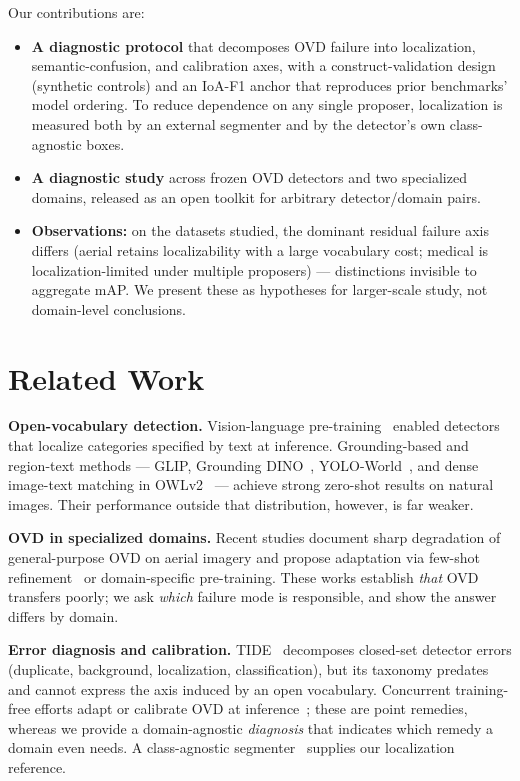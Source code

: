 \documentclass[10pt,twocolumn,letterpaper]{article}
\begin{document}
Our contributions are:
\begin{itemize}
  \item \textbf{A diagnostic protocol} that decomposes OVD failure into localization,
  semantic-confusion, and calibration axes, with a construct-validation design (synthetic
  controls) and an IoA-F1 anchor that reproduces prior benchmarks' model ordering. To reduce
  dependence on any single proposer, localization is measured both by an external
  segmenter and by the detector's own class-agnostic boxes.
  \item \textbf{A diagnostic study} across frozen OVD detectors and two specialized domains,
  released as an open toolkit for arbitrary detector/domain pairs.
  \item \textbf{Observations:} on the datasets studied, the dominant residual failure axis
  differs (aerial retains localizability with a large vocabulary cost; medical is
  localization-limited under multiple proposers) --- distinctions invisible to aggregate mAP.
  We present these as hypotheses for larger-scale study, not domain-level conclusions.
\end{itemize}

\section{Related Work}
\label{sec:related}
\textbf{Open-vocabulary detection.} Vision-language pre-training~\cite{radford2021clip}
enabled detectors that localize categories specified by text at inference. Grounding-based
and region-text methods --- GLIP, Grounding DINO~\cite{liu2023groundingdino},
YOLO-World~\cite{cheng2024yoloworld}, and dense image-text matching in
OWLv2~\cite{minderer2023scaling} --- achieve strong zero-shot results on natural images.
Their performance outside that distribution, however, is far weaker.

\textbf{OVD in specialized domains.} Recent studies document sharp degradation of
general-purpose OVD on aerial imagery and propose adaptation via few-shot
refinement~\cite{refael2025flame} or domain-specific pre-training. These works establish
\emph{that} OVD transfers poorly; we ask \emph{which} failure mode is responsible, and show
the answer differs by domain.

\textbf{Error diagnosis and calibration.} TIDE~\cite{bolya2020tide} decomposes closed-set
detector errors (duplicate, background, localization, classification), but its taxonomy
predates and cannot express the axis induced by an open vocabulary. Concurrent training-free
efforts adapt or calibrate OVD at inference~\cite{procal2026,factor2026}; these are point
remedies, whereas we provide a domain-agnostic \emph{diagnosis} that indicates which remedy a
domain even needs. A class-agnostic segmenter~\cite{kirillov2023sam} supplies our
localization reference.
\end{document}
